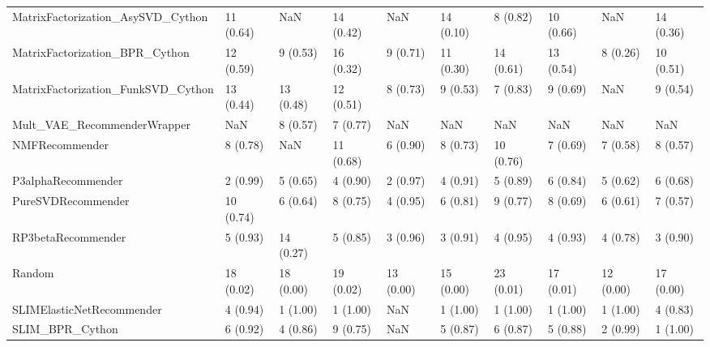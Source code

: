 \begin{tabular}{llllllllll}
  MatrixFactorization\_AsySVD\_Cython &                11 (0.64) &         NaN &     14 (0.42) &          NaN &            14 (0.10) &            8 (0.82) &         10 (0.66) &                NaN &         14 (0.36) \\
     MatrixFactorization\_BPR\_Cython &                12 (0.59) &    9 (0.53) &     16 (0.32) &     9 (0.71) &            11 (0.30) &           14 (0.61) &         13 (0.54) &           8 (0.26) &         10 (0.51) \\
 MatrixFactorization\_FunkSVD\_Cython &                13 (0.44) &   13 (0.48) &     12 (0.51) &     8 (0.73) &             9 (0.53) &            7 (0.83) &          9 (0.69) &                NaN &          9 (0.54) \\
        Mult\_VAE\_RecommenderWrapper &                      NaN &    8 (0.57) &      7 (0.77) &          NaN &                  NaN &                 NaN &               NaN &                NaN &               NaN \\
                     NMFRecommender &                 8 (0.78) &         NaN &     11 (0.68) &     6 (0.90) &             8 (0.73) &           10 (0.76) &          7 (0.69) &           7 (0.58) &          8 (0.57) \\
                 P3alphaRecommender &                 2 (0.99) &    5 (0.65) &      4 (0.90) &     2 (0.97) &             4 (0.91) &            5 (0.89) &          6 (0.84) &           5 (0.62) &          6 (0.68) \\
                 PureSVDRecommender &                10 (0.74) &    6 (0.64) &      8 (0.75) &     4 (0.95) &             6 (0.81) &            9 (0.77) &          8 (0.69) &           6 (0.61) &          7 (0.57) \\
                 RP3betaRecommender &                 5 (0.93) &   14 (0.27) &      5 (0.85) &     3 (0.96) &             3 (0.91) &            4 (0.95) &          4 (0.93) &           4 (0.78) &          3 (0.90) \\
                             Random &                18 (0.02) &   18 (0.00) &     19 (0.02) &    13 (0.00) &            15 (0.00) &           23 (0.01) &         17 (0.01) &          12 (0.00) &         17 (0.00) \\
          SLIMElasticNetRecommender &                 4 (0.94) &    1 (1.00) &      1 (1.00) &          NaN &             1 (1.00) &            1 (1.00) &          1 (1.00) &           1 (1.00) &          4 (0.83) \\
                    SLIM\_BPR\_Cython &                 6 (0.92) &    4 (0.86) &      9 (0.75) &          NaN &             5 (0.87) &            6 (0.87) &          5 (0.88) &           2 (0.99) &          1 (1.00) \\

\end{tabular}
